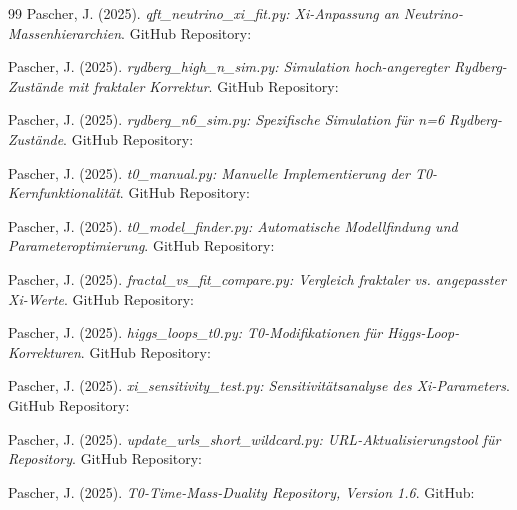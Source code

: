\begin{thebibliography}{99}
			Pascher, J. (2025). \textit{qft\_neutrino\_xi\_fit.py: Xi-Anpassung an Neutrino-Massenhierarchien}.
			GitHub Repository: 
			
			Pascher, J. (2025). \textit{rydberg\_high\_n\_sim.py: Simulation hoch-angeregter Rydberg-Zustände mit fraktaler Korrektur}.
			GitHub Repository: 
			
			Pascher, J. (2025). \textit{rydberg\_n6\_sim.py: Spezifische Simulation für n=6 Rydberg-Zustände}.
			GitHub Repository: 
			
			Pascher, J. (2025). \textit{t0\_manual.py: Manuelle Implementierung der T0-Kernfunktionalität}.
			GitHub Repository: 
			
			Pascher, J. (2025). \textit{t0\_model\_finder.py: Automatische Modellfindung und Parameteroptimierung}.
			GitHub Repository: 
			
			Pascher, J. (2025). \textit{fractal\_vs\_fit\_compare.py: Vergleich fraktaler vs. angepasster Xi-Werte}.
			GitHub Repository: 
			
			Pascher, J. (2025). \textit{higgs\_loops\_t0.py: T0-Modifikationen für Higgs-Loop-Korrekturen}.
			GitHub Repository: 
			
			Pascher, J. (2025). \textit{xi\_sensitivity\_test.py: Sensitivitätsanalyse des Xi-Parameters}.
			GitHub Repository: 
			
			Pascher, J. (2025). \textit{update\_urls\_short\_wildcard.py: URL-Aktualisierungstool für Repository}.
			GitHub Repository: 
			
			Pascher, J. (2025). \textit{T0-Time-Mass-Duality Repository, Version 1.6}.
			GitHub: 

	\end{thebibliography}
	